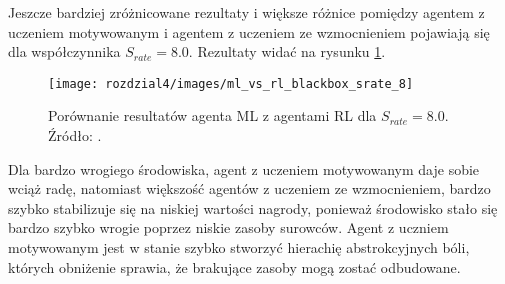 Jeszcze bardziej zróżnicowane rezultaty i większe różnice pomiędzy agentem
z uczeniem motywowanym i agentem z uczeniem ze wzmocnieniem pojawiają
się dla współczynnika $S_{rate}=8.0$. Rezultaty widać na rysunku \ref{fig:ml_vs_rl_blackbox_srate8}.

\begin{figure}[h]
    \centering
    \texttt{[image: rozdzial4/images/ml\_vs\_rl\_blackbox\_srate\_8]}
    \caption{Porównanie resultatów agenta ML z agentami RL dla $S_{rate}=8.0$. 
    Źródło: \cite{ml_vs_rl_comparative_study}.}
    \label{fig:ml_vs_rl_blackbox_srate8}
\end{figure}

Dla bardzo wrogiego środowiska, agent z uczeniem motywowanym daje sobie wciąż
radę, natomiast większość agentów z uczeniem ze wzmocnieniem, bardzo szybko 
stabilizuje się na niskiej wartości nagrody, ponieważ środowisko stało się
bardzo szybko wrogie poprzez niskie zasoby surowców. Agent z uczniem
motywowanym jest w stanie szybko stworzyć hierachię abstrokcyjnych bóli,
których obniżenie sprawia, że brakujące zasoby mogą zostać odbudowane.

